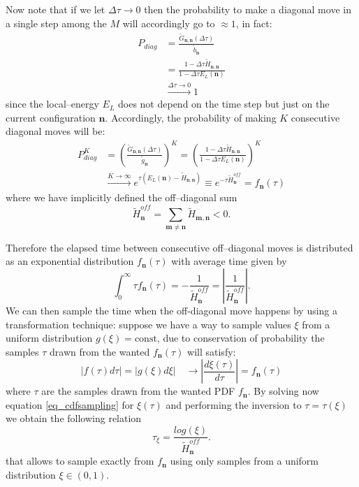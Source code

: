 Now note that if we let $\Delta\tau \to 0$ then the probability to make a diagonal move in a single step among the $M$ will accordingly go to $\approx 1$, in fact:
\begin{equation}
\begin{split}
P_{diag} &= \frac{\tilde{G}_{\mathbf{n},\mathbf{n}}(\Delta\tau)}{\tilde{b}_{\mathbf{n}}}\\
&= \frac{1-\Delta\tau \tilde{H}_{\mathbf{n},\mathbf{n}}}{1-\Delta\tau E_L(\mathbf{n})}\\
&\xrightarrow{\Delta\tau \to 0} 1
\end{split}
\end{equation}
since the local--energy $E_L$ does not depend on the time step but just on the current configuration $\mathbf{n}$. Accordingly, the probability of making $K$ consecutive diagonal moves will be:
\begin{equation}
\begin{split}
P_{diag}^K &=\left( \frac{\tilde{G}_{\mathbf{n},\mathbf{n}}(\Delta\tau)}{\tilde{g}_{\mathbf{n}}} \right)^K = \left( \frac{1-\Delta\tau \tilde{H}_{\mathbf{n},\mathbf{n}}}{1-\Delta\tau E_L(\mathbf{n})} \right)^K\\
&\xrightarrow{K \to \infty} e^{\tau (E_L(\mathbf{n}) - \tilde{H}_{\mathbf{n},\mathbf{n}})} \equiv e^{- \tau \tilde{H}^{off}_{\mathbf{n}}} = f_{\mathbf{n}}(\tau)
\end{split}
\end{equation}
where we have implicitly defined the off--diagonal sum 
\begin{equation*}
\tilde{H}^{off}_{\mathbf{n}} = \sum_{\mathbf{m}\neq \mathbf{n}} \tilde{H}_{\mathbf{m},\mathbf{n}} <0.
\end{equation*}

Therefore the elapsed time between consecutive off--diagonal moves
is distributed as an exponential distribution $f_{\mathbf{n}}(\tau)$ with average time given by
\begin{equation}
\int_{0}^{\infty} \tau f_{\mathbf{n}}(\tau) = -\frac{1}{\tilde{H}^{off}_{\mathbf{n}}} = \left\vert \frac{1}{\tilde{H}^{off}_{\mathbf{n}}}\right\vert .
\end{equation}
We can then sample the time when the off-diagonal move happens by using a transformation technique: suppose we have a way to sample values $\xi$ from a uniform distribution 
$g(\xi) = \text{const}$, due to conservation of probability the samples $\tau$ drawn from the wanted $f_{\mathbf{n}}(\tau)$ will satisfy:
\begin{equation}
\label{eq_cdfsampling}
\vert f(\tau) d\tau \vert = \vert g(\xi) d\xi \vert \quad \longrightarrow \left\vert \frac{d \xi(\tau)}{d \tau} \right\vert = f_{\mathbf{n}}(\tau)
\end{equation}
where $\tau$ are the samples drawn from the wanted PDF $f_{\mathbf{n}}$. By solving now equation \eqref{eq_cdfsampling} for $\xi(\tau)$ and performing the inversion to
$\tau=\tau(\xi)$ we obtain the following relation
\begin{equation}
\label{sampled_tau}
\tau_{\xi}=\frac{log(\xi)}{\tilde{H}^{off}_{\mathbf{n}}}.
\end{equation}
that allows to sample exactly from $f_{\mathbf{n}}$ using only samples from a uniform distribution $\xi \in (0,1)$.

